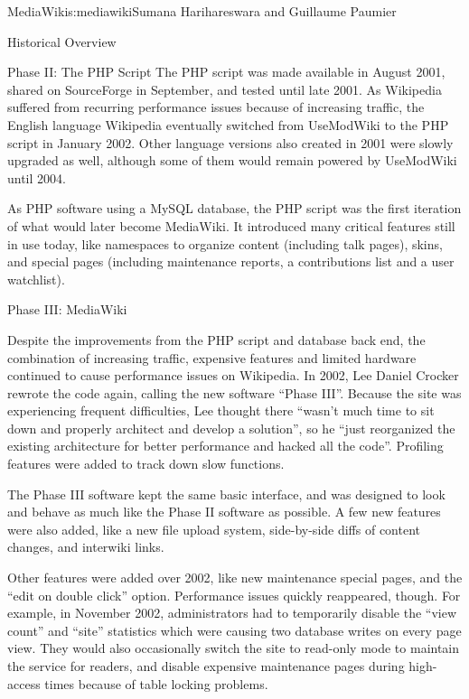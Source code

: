 \begin{aosachapter}{MediaWiki}{s:mediawiki}{Sumana Harihareswara and Guillaume Paumier}
\begin{aosasect1}{Historical Overview}
\begin{aosasect2}{Phase II: The PHP Script}
The PHP script was made available in August 2001, shared on
SourceForge in September, and tested until late 2001. As Wikipedia
suffered from recurring performance issues because of increasing
traffic, the English language Wikipedia eventually switched from
UseModWiki to the PHP script in January 2002. Other language versions
also created in 2001 were slowly upgraded as well, although some of
them would remain powered by UseModWiki until 2004.

As PHP software using a MySQL database, the PHP script was the first
iteration of what would later become MediaWiki. It introduced
many critical features still in use today, like namespaces to organize
content (including talk pages), skins, and special pages (including
maintenance reports, a contributions list and a user watchlist).

\end{aosasect2}

\begin{aosasect2}{Phase III: MediaWiki}

Despite the improvements from the PHP script and database back end,
the combination of increasing traffic, expensive features and limited
hardware continued to cause performance issues on Wikipedia. In 2002,
Lee Daniel Crocker rewrote the code again, calling the new software
``Phase III''. Because the site was experiencing frequent difficulties,
Lee thought there ``wasn't much time to sit down and properly architect
and develop a solution'', so he ``just reorganized the existing
architecture for better performance and hacked all the
code''. Profiling features were added to track down slow functions.

The Phase III software kept the same basic interface, and was designed
to look and behave as much like the Phase II software as possible. A
few new features were also added, like a new file upload system,
side-by-side diffs of content changes, and interwiki links.

Other features were added over 2002, like new maintenance special
pages, and the ``edit on double click'' option. Performance issues
quickly reappeared, though. For example, in November 2002,
administrators had to temporarily disable the ``view count'' and ``site''
statistics which were causing two database writes on every page
view. They would also occasionally switch the site to read-only mode
to maintain the service for readers, and disable expensive maintenance
pages during high-access times because of table locking problems.


\end{aosasect2}
\end{aosasect1}
\end{aosachapter}
